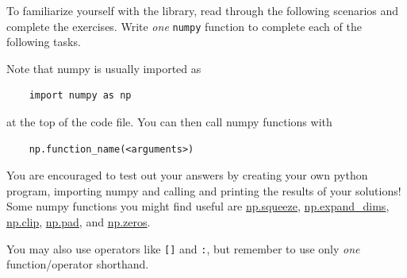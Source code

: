  To familiarize yourself with the library, read through the following scenarios and complete the exercises. Write \emph{one} \texttt{numpy} function to complete each of the following tasks.

Note that numpy is usually imported as
\begin{verbatim}
    import numpy as np
\end{verbatim}
at the top of the code file. You can then call numpy functions with \begin{verbatim}
    np.function_name(<arguments>)
\end{verbatim}
You are encouraged to test out your answers by creating your own python program, importing numpy and calling and printing the results of your solutions! Some numpy functions you might find useful are \href{https://numpy.org/doc/stable/reference/generated/numpy.squeeze.html}{np.squeeze}, \href{https://numpy.org/doc/stable/reference/generated/numpy.expand_dims.html}{np.expand\_dims}, \href{https://numpy.org/doc/stable/reference/generated/numpy.clip.html}{np.clip}, \href{https://numpy.org/doc/stable/reference/generated/numpy.pad.html}{np.pad}, and \href{https://numpy.org/doc/stable/reference/generated/numpy.zeros.html}{np.zeros}.

You may also use operators like \texttt{[]} and \texttt{:}, but remember to use only \textit{one} function/operator shorthand.

